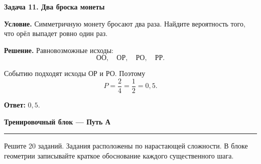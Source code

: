 \documentclass[a4paper,12pt]{article}
\newcommand{\Section}[1]{%
  \Needspace{5\baselineskip}%
  \vspace{0.6em}%
  {\Large\bfseries\color{darkaccent}#1}\par
  \vspace{0.2em}%
  {\color{accent}\rule{0.14\linewidth}{1.2pt}}\par
  \vspace{0.4em}%
}
\newcommand{\Subsection}[1]{%
  \Needspace{3\baselineskip}%
  \vspace{0.45em}%
  {\large\bfseries\color{darkaccent}#1}\par
  \vspace{0.15em}%
}
\newcommand{\Key}[1]{\textbf{\color{darkaccent}#1}}
\begin{document}
\clearpage

\Subsection{Задача 11. Два броска монеты}

\Key{Условие.}
Симметричную монету бросают два раза.
Найдите вероятность того, что орёл выпадет ровно один раз.

\Key{Решение.}
Равновозможные исходы:
\[
  \text{ОО},
  \quad
  \text{ОР},
  \quad
  \text{РО},
  \quad
  \text{РР}.
\]

Событию подходят исходы ОР и РО. Поэтому
\[
  P
  =
  \frac{2}{4}
  =
  \frac12
  =
  0{,}5.
\]

\Key{Ответ:} $0{,}5$.

\Section{Тренировочный блок — Путь А}

Решите 20 заданий.
Задания расположены по нарастающей сложности.
В блоке геометрии записывайте краткое обоснование каждого существенного шага.
\end{document}
